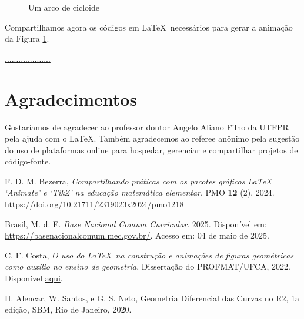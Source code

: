 \documentclass[10pt]{article}
\theoremstyle{plain} %
\theoremstyle{definition} %
\theoremstyle{remark} %
\begin{document}
\begin{figure}[!htp]
\centering
\begin{animateinline}[poster = last, controls]{25}
\end{animateinline}
\caption{Um arco de cicloide}
\label{FigArcCicloide}
\end{figure}

Compartilhamos agora os códigos em  \LaTeX\ necessários para gerar a animação da Figura \ref{FigArcCicloide}.



\href{.................}{....................}



\section*{Agradecimentos}

Gostaríamos de agradecer ao professor doutor Angelo Aliano Filho da UTFPR pela ajuda com o \LaTeX. Também agradecemos ao referee anônimo pela sugestão do uso de plataformas online para hospedar, gerenciar e compartilhar projetos de código-fonte.




\begin{thebibliography}{}	
F. D. M. Bezerra, \textit{Compartilhando práticas com os pacotes gráficos LaTeX ‘Animate’ e ‘TikZ’
na educação matemática elementar}. PMO {\bf 12} (2), 2024.  https://doi.org/10.21711/2319023x2024/pmo1218


Brasil, M. d. E. 
\textit{Base Nacional Comum Curricular}.
2025.
Disponível em: \url{https://basenacionalcomum.mec.gov.br/}.
Acesso em: 04 de maio de 2025.

C. F. Costa, \textit{O uso do \LaTeX\ na construção e animações de figuras geométricas como auxílio no ensino de geometria}, Dissertação do PROFMAT/UFCA, 2022. Disponível \href{https://sca.profmat-sbm.org.br/profmat_tcc.php?id1=6814&id2=171053976}{aqui}.

 H. Alencar, W. Santos, e G. S. Neto, Geometria Diferencial das Curvas no R2, 1a edição, SBM, Rio de Janeiro, 2020.
\end{thebibliography}

 
\end{document}
